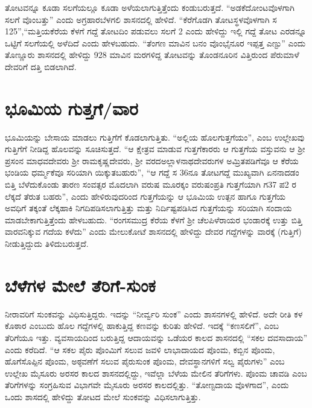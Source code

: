 ತೋಟವನ್ನೂ ಕೂಡಾ ಸಲಗೆಯಲ್ಲೂ ಕೂಡಾ ಅಳೆಯಲಾಗುತ್ತಿತ್ತೆಂದು ಕಂಡುಬರುತ್ತದೆ. “ಅಡಕೆದೋಂಟವೊಳ\-ಗಾಗಿ ಸಲಗೆ ವೊಂಬತ್ತು” ಎಂದು ಅಗ್ರಹಾರಬೆಳಗಲಿ ಶಾಸನದಲ್ಲಿ ಹೇಳಿದೆ. “ಕೆರೆಗೊಡಗಿ ತೋಟಸ್ಥಳವೊಳಗಾಗಿ ಸ 125”,\break “ಮತ್ತಿಯಕೆರೆಯ ಕೆಳಗೆ ಗದ್ದೆ ತೋಟದಿಂ ಪಡುವಲು ಸಲಗೆ 2 ಎಂದು ಹೇಳಿದ್ದು ಇಲ್ಲಿ ಗದ್ದೆ ತೋಟ ಎರಡನ್ನೂ ಒಟ್ಟಿಗೆ ಸಲಗೆಯಲ್ಲಿ ಅಳೆದಿದೆ ಎಂದು ಹೇಳಬಹುದು. “ತೆಂಗಣ ಮಾವಿನ ಬನಂ ವೊಂಭೈನೂರ ಇಪ್ಪತ್ತ ಎಣ್ಟು” ಎಂದು ತೊಣ್ಣೂರು ಶಾಸನದಲ್ಲಿ ಹೇಳಿದ್ದು 928 ಮಾವಿನ ಮರಗಳಿದ್ದ ತೋಟವನ್ನು ತೊಂಡನೂರಿನ ವಿತ್ತಿರುಂದ ಪೆರುಮಾಳೆ ದೇವರಿಗೆ ದತ್ತಿ ಬಿಡಲಾಗಿದೆ.


\section{ಭೂಮಿಯ ಗುತ್ತಗೆ/ವಾರ}

ಭೂಮಿಯನ್ನು ಬೇಸಾಯ ಮಾಡಲು ಗುತ್ತಿಗೆಗೆ ಕೊಡಲಾಗುತ್ತಿತು. “ಅಲ್ಲಿಯ ಹೊಲಗುತ್ತಗೆಯಂ”, ಎಂಬ ಉಲ್ಲೇಖವು ಗುತ್ತಿಗೆಗೆ ನೀಡಿದ್ದ ಹೊಲವನ್ನು ಸೂಚಿಸುತ್ತದೆ. “ಆ ಕ್ಷೇತ್ರವ ಮಾಡುವ ಗುತ್ತಗೆಕಾರರು ಆ ಗುತ್ತಗೆಯ ವಸ್ತುವನು ಆ ಶ‍್ರೀ ಪ್ರಸಂನ ಮಾಧವದೇವರು ಶ‍್ರೀ ರಾಮಕೃಷ್ಣದೇವರು, ಶ‍್ರೀ ವರದಅಲ್ಲಾಳನಾಥದೇವರುಗಳ ಅಮ್ರಿತಪಡಿಗೆವೂ ಆ ಕೆರೆಯ ಭಂಡಿಯ ಧರ್ಮ್ಮಕೆವೂ ಸರಿಯಾಗಿ ಯಿಕ್ಕುತಬಹುರು”, “ಆ ಗದ್ದೆ ಸ 36ನೂ ತೋಟಗದ್ದೆ ಮುಖ್ಯವಾಗಿ ಏನನಾದಡಂ ಬಿತ್ತಿ ಬೆಳೆದುಕೊಂಡು ತಾರಣ ಸಂವತ್ಸರ ಮೊದಲಾಗಿ ವರುಷ ಮೂರಕ್ಕಂ ವರುಷಂಪ್ರತಿ ಗುತ್ತಗೆಯಾಗಿ ಗ37 ಪ2 ರ ಲೆಕ್ಕದೆ ತೆರುತ ಬಹರು”, ಎಂದು ಹೇಳಿರುವುದರಿಂದ ಗುತ್ತಗೆಯನ್ನು ಆ ಭೂಮಿಯ ಉತ್ಪನ ಹಾಗೂ ಗುತ್ತಗೆಯ ಅವಧಿಗೆ ತಕ್ಕಂತೆ ಲೆಕ್ಕಹಾಕಿ ನಿಗದಿಪಡಿಸಲಾಗುತ್ತಿತ್ತು ಮತ್ತು ನಿರ್ದಿಷ್ಟಪಡಿಸಿದ ಗುತ್ತಗೆಯನ್ನು ಸರಿಯಾಗಿ ಸಂದಾಯ ಮಾಡಬೇಕಾಗುತ್ತಿತ್ತೆಂದು ಹೇಳಬಹುದು. “ರಂಗಸಮುದ್ರ ಕೆರೆಯ ಕೆಳಗೆ ಶ‍್ರೀ ಚೆಲಪಿಳೆರಾಯರ ಭಂಡಾರಕ್ಕೆ ಉತ್ತು ಬಿತ್ತಿ ವಾರವನಿಕ್ಕುವ ಗದೆಯ ಕಳೆದು” ಎಂದು ಮೇಲುಕೋಟೆ ಶಾಸನದಲ್ಲಿ ಹೇಳಿದ್ದು ದೇವರ ಗದ್ದೆಗಳನ್ನು ವಾರಕ್ಕೆ (ಗುತ್ತಿಗೆ) ನೀಡುತ್ತಿದ್ದುದು ತಿಳಿದುಬರುತ್ತದೆ.


\section{ಬೆಳೆಗಳ ಮೇಲೆ ತೆರಿಗೆ-ಸುಂಕ}

ನೀರಾವರಿಗೆ ಸುಂಕವನ್ನು ವಿಧಿಸುತ್ತಿದ್ದರು. ಇದನ್ನು “ನೀರ್ವ್ವರಿ ಸುಂಕ” ಎಂದು ಶಾಸನಗಳಲ್ಲಿ ಹೇಳಿದೆ. ಅದೇ ರೀತಿ ಕಳ ಕೊಠಾರ ಎಂಬುದು ಹೊಲ ಗದ್ದೆಗಳಲ್ಲಿ ಹಾಕುತ್ತಿದ್ದ ಕಣವನ್ನು ಕುರಿತು ಹೇಳಿದೆ. ಇದಕ್ಕೆ “ಕಣಸಲಿಗೆ”, ಎಂಬ ತೆರಿಗೆಯೂ ಇತ್ತು. ವ್ಯವಸಾಯದಿಂದ ಬರುತ್ತಿದ್ದ ಆದಾಯವನ್ನು ಒಡೆಯರ ಕಾಲದ ಶಾಸನದಲ್ಲಿ “ಸಕಲ ದವಸಾದಾಯ” ಎಂದು ಕರೆದಿದೆ. “ಆ ಸಕಲ ಪೈರು ಪೊಂಮಿಗೆ ಸಲುವ ಜವಳಿ ಲಾಭಾದಾಯದ ಪೊಂಮ, ಕಬ್ಬಿನ ಪೊಂಮ, ಹೊಗೆಸೊಪ್ಪಿನ ಪೊಂಮ, ಅಠ್ಠವಣೆಗೆ ಸಲುವ ಪೈರುಸುಂಕ ಪೊಂಮ, ದೇವಸ್ಥಾನಗಳಿಗೆ ಸಲ್ವ ಪೈರುಗಳು” ಎಂಬ ಉಲ್ಲೇಖ ಮೈಸೂರು ಅರಸರ ಕಾಲದ ಶಾಸನದಲ್ಲಿದ್ದು, ಇವೆಲ್ಲಾ ಬೆಳೆಯ ಮೇಲಿನ ತೆರಿಗೆಗಳು. ಪೊಂಮ ಚಾವಡಿ ಎಂಬ ತೆರಿಗೆಗಳನ್ನು ಸಂಗ್ರಹಿಸುವ ವಿಭಾಗವೇ ಮೈಸೂರು ಅರಸರ ಕಾಲದಲ್ಲಿತ್ತು. “ತೋಣ್ಟದಾಯ ವೊಳಗಾದ”, ಎಂದು ಒಂದು ಶಾಸದಲ್ಲಿ ಹೇಳಿದ್ದು ತೋಟದ ಮೇಲೆ ಸುಂಕವನ್ನು ವಿಧಿಸಲಾಗುತ್ತಿತ್ತು.


